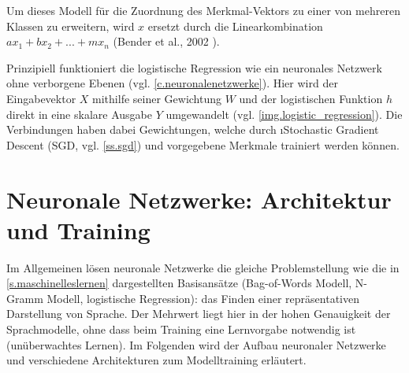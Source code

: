 
Um dieses Modell für die Zuordnung des Merkmal-Vektors zu einer von mehreren Klassen zu erweitern, wird $x$ ersetzt durch die Linearkombination $a x_1 + b x_2 + ... + m x_n$ (Bender et al., 2002 \citep{Bender2002}).

Prinzipiell funktioniert die logistische Regression wie ein neuronales Netzwerk ohne verborgene Ebenen (vgl. \autoref{c.neuronalenetzwerke}). Hier wird der Eingabevektor $X$ mithilfe seiner Gewichtung $W$ und der logistischen Funktion $h$ direkt in eine skalare Ausgabe $Y$ umgewandelt (vgl. \autoref{img.logistic_regression}). Die Verbindungen haben dabei Gewichtungen, welche durch \i{Stochastic Gradient Descent} (SGD, vgl. \autoref{ss.sgd}) und vorgegebene Merkmale trainiert werden können.




\chapter{Neuronale Netzwerke: Architektur und Training}\label{c.neuronalenetzwerke}

Im Allgemeinen lösen neuronale Netzwerke die gleiche Problemstellung wie die in \autoref{s.maschinelleslernen} dargestellten Basisansätze (Bag-of-Words Modell, N-Gramm Modell, logistische Regression): das Finden einer repräsentativen Darstellung von Sprache. Der Mehrwert liegt hier in der hohen Genauigkeit der Sprachmodelle, ohne dass beim Training eine Lernvorgabe notwendig ist (unüberwachtes Lernen).
Im Folgenden wird der Aufbau neuronaler Netzwerke und verschiedene Architekturen zum Modelltraining erläutert.

